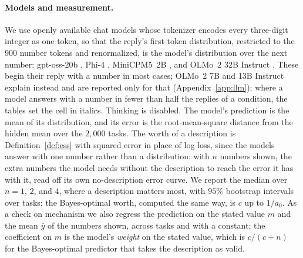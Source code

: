 \documentclass{article}
\begin{document}
\paragraph{Models and measurement.} We use openly available chat models whose tokenizer encodes every three-digit integer as one token, so that the reply's first-token distribution, restricted to the $900$ number tokens and renormalized, is the model's distribution over the next number: gpt-oss-20b \citep{openai2025}, Phi-4 \citep{abdin2024}, MiniCPM5~2B \citep{minicpm5}, and OLMo~2 32B Instruct \citep{walsh2025}. These begin their reply with a number in most cases; OLMo~2 7B and 13B Instruct explain instead and are reported only for that (Appendix~\ref{app:llm}); where a model answers with a number in fewer than half the replies of a condition, the tables set the cell in italics. Thinking is disabled. The model's prediction is the mean of its distribution, and its error is the root-mean-square distance from the hidden mean over the $2{,}000$ tasks. The worth of a description is Definition~\ref{def:ess} with squared error in place of log loss, since the models answer with one number rather than a distribution: with $n$ numbers shown, the extra numbers the model needs without the description to reach the error it has with it, read off its own no-description error curve. We report the median over $n = 1$, $2$, and $4$, where a description matters most, with $95\%$ bootstrap intervals over tasks; the Bayes-optimal worth, computed the same way, is $c$ up to $1/a_0$. As a check on mechanism we also regress the prediction on the stated value $m$ and the mean $\bar y$ of the numbers shown, across tasks and with a constant; the coefficient on $m$ is the model's \emph{weight} on the stated value, which is $c/(c+n)$ for the Bayes-optimal predictor that takes the description as valid.

\begin{table}[t]
\centering\small
\setlength{\tabcolsep}{2.4pt}
\caption{\textbf{A loose description is worth what it should be; a precise one is worth a small fraction.} Worth of a description in demonstrations, model against Bayes-optimal: the median over $1$, $2$, and $4$ numbers shown of the extra numbers needed without the description to match the error with it ($\sigma = 60$, $2{,}000$ tasks; brackets, $95\%$ bootstrap intervals). Columns: a valid description that should be worth $1$, $4$, or $36$; a wrong one worth $36$ (negative: it costs that many); the description worth $36$ with a stated $10\%$ or $50\%$ chance of being wrong; a wrong one with a stated $50\%$ chance. The Bayes-optimal predictor takes a description as valid unless a reliability is stated, in which case it hedges with that $p$.}
\label{tab:llm}
\vspace{3pt}

\end{table}
\end{document}
